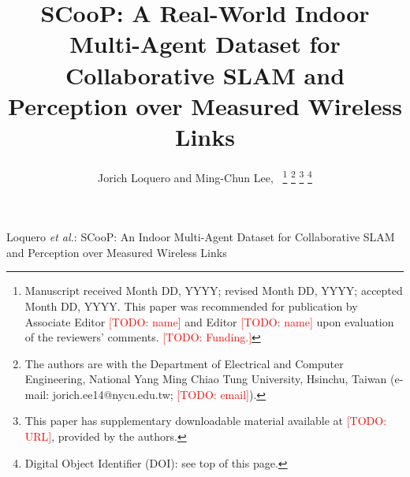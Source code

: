 \documentclass[journal]{IEEEtran}
\newcommand{\todo}[1]{\textcolor{red}{[TODO: #1]}}
\begin{document}
\title{SCooP: A Real-World Indoor Multi-Agent Dataset for Collaborative SLAM and Perception over Measured Wireless Links}

\author{Jorich Loquero and Ming-Chun Lee,~%
\thanks{Manuscript received Month DD, YYYY; revised Month DD, YYYY; accepted
Month DD, YYYY. This paper was recommended for publication by Associate
Editor \todo{name} and Editor \todo{name} upon evaluation of the
reviewers' comments. \todo{Funding.}}%
\thanks{The authors are with the Department of Electrical and Computer
Engineering, National Yang Ming Chiao Tung University, Hsinchu, Taiwan
(e-mail: jorich.ee14@nycu.edu.tw; \todo{email}).}%
\thanks{This paper has supplementary downloadable material available at
\todo{URL}, provided by the authors.}%
\thanks{Digital Object Identifier (DOI): see top of this page.}}

%
{Loquero \MakeLowercase{\textit{et al.}}: SCooP: An Indoor Multi-Agent Dataset for Collaborative SLAM and Perception over Measured Wireless Links}

\maketitle
\end{document}

